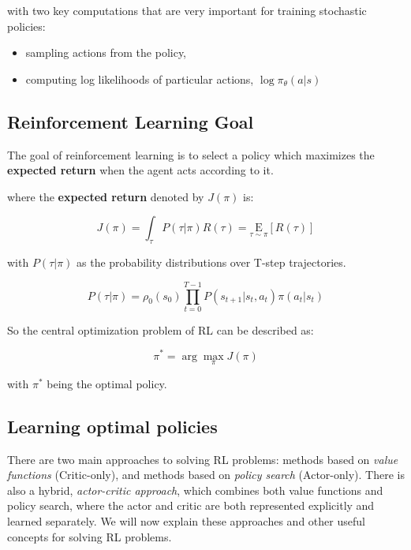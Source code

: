 with two key computations that are very important for training stochastic policies:
\begin{itemize}
		\item sampling actions from the policy,
		\item computing log likelihoods of particular actions, $ \log \pi_{\theta}(a|s) $
\end{itemize}


\subsection{Reinforcement Learning Goal}
The goal of reinforcement learning is to select a policy which maximizes the \textbf{expected return} when the agent acts according to it.

where the \textbf{expected return} denoted by $ J(\pi) $ is:
\begin{center}
		\begin{equation} \label{eq:expected_return}
				J(\pi)=\int_{\tau} P(\tau | \pi) R(\tau)=\underset{\tau \sim \pi}{\mathrm{E}}[R(\tau)]
		\end{equation}
\end{center}

with $ P(\tau | \pi) $ as the probability distributions over T-step trajectories.
\begin{center}
		\begin{equation}
				P(\tau | \pi)=\rho_{0}\left(s_{0}\right) \prod_{t=0}^{T-1} P\left(s_{t+1} | s_{t}, a_{t}\right) \pi\left(a_{t} | s_{t}\right)
		\end{equation}
\end{center}

So the central optimization problem of RL can be described as:
\begin{center}
		\begin{equation}
				\pi^{*}=\arg \max _{\pi} J(\pi)
		\end{equation}
\end{center}
with $\pi^*$ being the optimal policy.


\subsection{Learning optimal policies}
There are two main approaches to solving RL problems: methods based on \textit{value functions} (Critic-only), and methods based on \textit{policy search} (Actor-only).
There is also a hybrid, \textit{actor-critic approach}, which combines both value functions and policy search, where the actor and critic are both represented explicitly and learned separately.
We will now explain these approaches and other useful concepts for solving RL problems.

